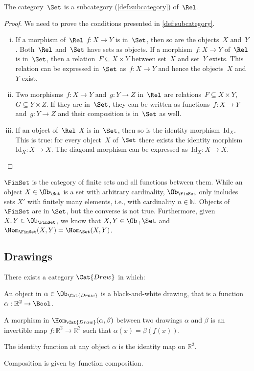 \begin{lemma}
    The category~$\Set$ is a subcategory (\cref{def:subcategory}) of~$\Rel$.
\end{lemma}
\begin{proof}
	We need to prove the conditions presented in \cref{def:subcategory}.
	\begin{enumerate}[(i)]
	\item If a morphism of~$\Rel$ $f \colon X\to Y$ is in~$\Set$, then so are the objects~$X$ and~$Y$. Both~$\Rel$ and~$\Set$ have sets as objects. If a morphism~$f\colon X\to Y$ of~$\Rel$ is in~$\Set$, then a relation~$F\subseteq X\times Y$ between set~$X$ and set~$Y$ exists. This relation can be expressed in~$\Set$ as~$f\colon X\to Y$ and hence the objects~$X$ and~$Y$ exist.
	\item Two morphisms~$f\colon X\to Y$ and~$g\colon Y\to Z$ in~$\Rel$ are relations~$F\subseteq X\times Y$,~$G\subseteq Y\times Z$. If they are in~$\Set$, they can be written as functions~$f\colon X\to Y$ and~$g\colon Y\to Z$ and their composition is in~$\Set$ as well. 
	\item If an object of~$\Rel$ $X$ is in~$\Set$, then so is the identity morphism~$\text{Id}_X$. This is true: for every object~$X$ of~$\Set$ there exists the identity morphism~$\text{Id}_X\colon X\to X$. The diagonal morphism can be expressed as~$\text{Id}_X\colon X\to X$.
	\end{enumerate}
\end{proof}

\begin{example}
$\FinSet$ is the category of finite sets and all functions between them. While an object $X\in \Ob_\Set$ is a set with arbitrary cardinality, $\Ob_{\FinSet}$ only includes sets $X'$ with finitely many elements, i.e., with cardinality $n\in \mathbb{N}$. Objects of $\FinSet$ are in $\Set$, but the converse is not true. Furthermore, given $X,Y\in \Ob_\FinSet$, we know that $X,Y\in \Ob_+\Set$ and $\Hom_{\FinSet}(X,Y)=\Hom_{\Set}(X,Y)$.
\end{example}

\subsection{Drawings}

\newcommand{\Draw}{\Cat{Draw}}

\begin{definition}
There exists a category $\Draw$ in which:
\begin{compactenum}
\item An object in $\alpha\in \Ob_\Draw$ is a black-and-white drawing,
that is a function $\alpha : \mathbb{R}^2 \to \Bool$.
\item A morphism in $\Hom_{\Draw}(\alpha, \beta)$ between two drawings
$\alpha$ and $\beta$ is an invertible map $f: \mathbb{R}^2 \to \mathbb{R}^2$ such that
$\alpha(x) = \beta(f(x))$.
\item The identity function at any object $\alpha$ is the identity map 
on $\mathbb{R}^2$. 
\item Composition is given by function composition. 
\end{compactenum}
\end{definition}
 
